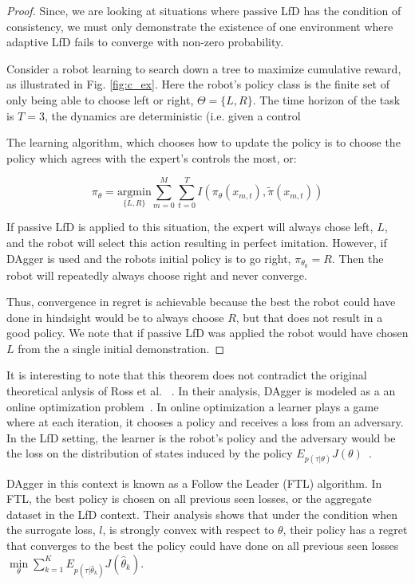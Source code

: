 \documentclass[10pt, conference]{ieeeconf}      %
\begin{document}
\begin{proof}
Since, we are looking at situations where passive LfD has the condition of consistency, we must only demonstrate the existence of one environment where adaptive LfD fails to converge with non-zero probability. 

Consider a robot learning to search down a tree to maximize cumulative reward, as illustrated in Fig. \ref{fig:c_ex}. Here the robot's policy class is the finite set of only being able to choose left or right, $\Theta = \lbrace L,R \rbrace$. The time horizon of the task is $T=3$, the dynamics are deterministic (i.e. given a control 

The learning algorithm, which chooses how to update the policy is to choose the policy which agrees with the expert's controls the most, or: 

$$\pi_{\theta} = \underset{\lbrace L,R \rbrace}{\mbox{argmin}} \sum^M_{m=0}\sum^T_{t=0} I(\pi_\theta(x_{m,t}),\tilde{\pi}(x_{m,t}))$$

If passive LfD is applied to this situation, the expert will always chose left, $L$, and the robot will select this action resulting in perfect imitation. However, if DAgger is used and the robots initial policy is to go right, $\pi_{\theta_0} = R$. Then the robot will repeatedly always choose right and never converge. 

Thus, convergence in regret is achievable because the best the robot could have done in hindsight would be to always choose $R$, but that does not result in a good policy. We note that if passive LfD was applied the robot would have chosen $L$ from the a single initial demonstration. 

\end{proof}

It is interesting to note that this theorem does not contradict the original theoretical anlysis of Ross et al. ~\cite{ross2010reduction}. In their analysis, DAgger is modeled as a  an online optimization problem~\cite{ross2010reduction}.  In online optimization a learner plays a game where at each iteration, it chooses a policy and receives a loss from an adversary.  In the LfD setting, the learner is the robot's policy and the adversary would be the loss on the distribution of states induced by the policy $E_{p(\tau|\theta)} J(\theta)$~\cite{shalev2011online}.

DAgger in this context is known as a Follow the Leader (FTL) algorithm. In FTL, the best policy is chosen on all previous seen losses, or the aggregate dataset in the LfD context. Their analysis shows that under the condition when the surrogate loss, $l$, is strongly convex with respect to $\theta$, their policy has a regret that converges to the best the policy could have done on all previous seen losses $\underset{\theta}{\min} \sum_{k=1}^K E_{p(\tau|\hat{\theta}_k)}J(\hat{\theta}_k)$. 
\end{document}

